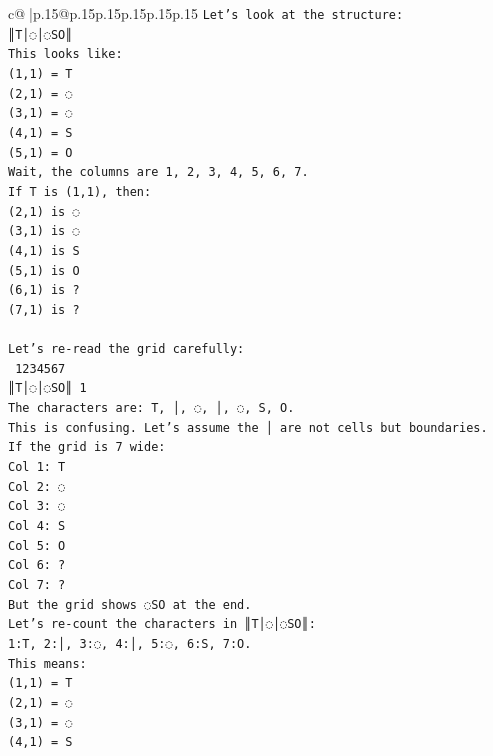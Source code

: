 \documentclass{article}
\begin{document}
{\begin{supertabular}{c@{$\;$}|p{.15\linewidth}@{}p{.15\linewidth}p{.15\linewidth}p{.15\linewidth}p{.15\linewidth}p{.15\linewidth}}
{{{\texttt{Let's look at the structure:} \\
\texttt{║T│◌│◌SO║} \\
\texttt{This looks like:} \\
\texttt{(1,1) = T} \\
\texttt{(2,1) = ◌} \\
\texttt{(3,1) = ◌} \\
\texttt{(4,1) = S} \\
\texttt{(5,1) = O} \\
\texttt{Wait, the columns are 1, 2, 3, 4, 5, 6, 7.} \\
\texttt{If T is (1,1), then:} \\
\texttt{(2,1) is ◌} \\
\texttt{(3,1) is ◌} \\
\texttt{(4,1) is S} \\
\texttt{(5,1) is O} \\
\texttt{(6,1) is ?} \\
\texttt{(7,1) is ?} \\
\\ 
\texttt{Let's re{-}read the grid carefully:} \\
\texttt{ 1234567} \\
\texttt{║T│◌│◌SO║ 1} \\
\texttt{The characters are: T, │, ◌, │, ◌, S, O.} \\
\texttt{This is confusing. Let's assume the │ are not cells but boundaries.} \\
\texttt{If the grid is 7 wide:} \\
\texttt{Col 1: T} \\
\texttt{Col 2: ◌} \\
\texttt{Col 3: ◌} \\
\texttt{Col 4: S} \\
\texttt{Col 5: O} \\
\texttt{Col 6: ?} \\
\texttt{Col 7: ?} \\
\texttt{But the grid shows ◌SO at the end.} \\
\texttt{Let's re{-}count the characters in ║T│◌│◌SO║:} \\
\texttt{1:T, 2:│, 3:◌, 4:│, 5:◌, 6:S, 7:O.} \\
\texttt{This means:} \\
\texttt{(1,1) = T} \\
\texttt{(2,1) = ◌} \\
\texttt{(3,1) = ◌} \\
\texttt{(4,1) = S} \\
}}}
\end{supertabular}}
\end{document}
